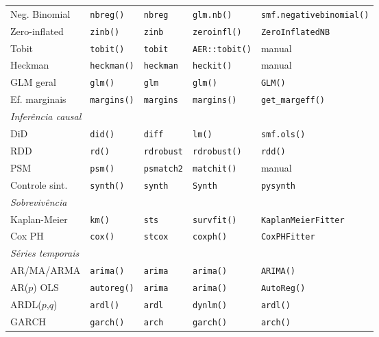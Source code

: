 {\begin{longtable}{lllll}
Neg. Binomial   & \texttt{nbreg()}      & \texttt{nbreg}        & \texttt{glm.nb()}      & \texttt{smf.negativebinomial()} \\
Zero-inflated   & \texttt{zinb()}       & \texttt{zinb}         & \texttt{zeroinfl()}    & \texttt{ZeroInflatedNB} \\
Tobit           & \texttt{tobit()}      & \texttt{tobit}        & \texttt{AER::tobit()}  & manual \\
Heckman         & \texttt{heckman()}    & \texttt{heckman}      & \texttt{heckit()}      & manual \\
GLM geral       & \texttt{glm()}        & \texttt{glm}          & \texttt{glm()}         & \texttt{GLM()} \\
Ef. marginais   & \texttt{margins()}    & \texttt{margins}      & \texttt{margins()}     & \texttt{get\_margeff()} \\
\midrule
\multicolumn{5}{l}{\textit{Inferência causal}} \\
DiD             & \texttt{did()}        & \texttt{diff}         & \texttt{lm()}          & \texttt{smf.ols()} \\
RDD             & \texttt{rd()}         & \texttt{rdrobust}     & \texttt{rdrobust()}    & \texttt{rdd()} \\
PSM             & \texttt{psm()}        & \texttt{psmatch2}     & \texttt{matchit()}     & manual \\
Controle sint.  & \texttt{synth()}      & \texttt{synth}        & \texttt{Synth}         & \texttt{pysynth} \\
\midrule
\multicolumn{5}{l}{\textit{Sobrevivência}} \\
Kaplan-Meier    & \texttt{km()}         & \texttt{sts}          & \texttt{survfit()}     & \texttt{KaplanMeierFitter} \\
Cox PH          & \texttt{cox()}        & \texttt{stcox}        & \texttt{coxph()}       & \texttt{CoxPHFitter} \\
\midrule
\multicolumn{5}{l}{\textit{Séries temporais}} \\
AR/MA/ARMA      & \texttt{arima()}      & \texttt{arima}        & \texttt{arima()}       & \texttt{ARIMA()} \\
AR($p$) OLS     & \texttt{autoreg()}    & \texttt{arima}        & \texttt{arima()}       & \texttt{AutoReg()} \\
ARDL($p$,$q$)   & \texttt{ardl()}       & \texttt{ardl}         & \texttt{dynlm()}       & \texttt{ardl()} \\
GARCH           & \texttt{garch()}      & \texttt{arch}         & \texttt{garch()}       & \texttt{arch()} \\

\end{longtable}}
